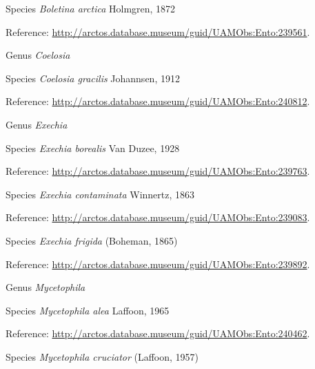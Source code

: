 \documentclass[9pt, article]{memoir}
\begin{document}
\begin{multicols}{2}
\vspace{6pt}\noindent\hspace{36pt}Species \textit{Boletina arctica} Holmgren, 1872


Reference: 
\url{http://arctos.database.museum/guid/UAMObs:Ento:239561}.

\vspace{6pt}\noindent\hspace{30pt}Genus \textit{Coelosia}


\vspace{6pt}\noindent\hspace{36pt}Species \textit{Coelosia gracilis} Johannsen, 1912


Reference: 
\url{http://arctos.database.museum/guid/UAMObs:Ento:240812}.

\vspace{6pt}\noindent\hspace{30pt}Genus \textit{Exechia}


\vspace{6pt}\noindent\hspace{36pt}Species \textit{Exechia borealis} Van Duzee, 1928


Reference: 
\url{http://arctos.database.museum/guid/UAMObs:Ento:239763}.

\vspace{6pt}\noindent\hspace{36pt}Species \textit{Exechia contaminata} Winnertz, 1863


Reference: 
\url{http://arctos.database.museum/guid/UAMObs:Ento:239083}.

\vspace{6pt}\noindent\hspace{36pt}Species \textit{Exechia frigida} (Boheman, 1865)


Reference: 
\url{http://arctos.database.museum/guid/UAMObs:Ento:239892}.

\vspace{6pt}\noindent\hspace{30pt}Genus \textit{Mycetophila}


\vspace{6pt}\noindent\hspace{36pt}Species \textit{Mycetophila alea} Laffoon, 1965


Reference: 
\url{http://arctos.database.museum/guid/UAMObs:Ento:240462}.

\vspace{6pt}\noindent\hspace{36pt}Species \textit{Mycetophila cruciator} (Laffoon, 1957)



\end{multicols}
\end{document}
